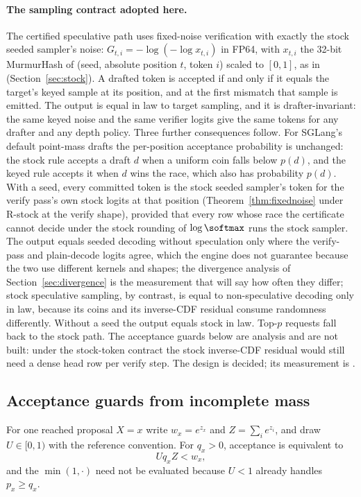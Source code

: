 \paragraph{The sampling contract adopted here.} The certified speculative path uses fixed-noise verification with exactly the stock seeded sampler's noise: $G_{t,i}=-\log(-\log x_{t,i})$ in FP64, with $x_{t,i}$ the 32-bit MurmurHash of (seed, absolute position $t$, token $i$) scaled to $[0,1]$, as in  (Section~\ref{sec:stock}). A drafted token is accepted if and only if it equals the target's keyed sample at its position, and at the first mismatch that sample is emitted. The output is equal in law to target sampling, and it is drafter-invariant: the same keyed noise and the same verifier logits give the same tokens for any drafter and any depth policy. Three further consequences follow. For SGLang's default point-mass drafts the per-position acceptance probability is unchanged: the stock rule accepts a draft $d$ when a uniform coin falls below $p(d)$, and the keyed rule accepts it when $d$ wins the race, which also has probability $p(d)$. With a seed, every committed token is the stock seeded sampler's token for the verify pass's own stock logits at that position (Theorem~\ref{thm:fixednoise} under R-stock at the verify shape), provided that every row whose race the certificate cannot decide under the stock rounding of $\log\softmax$ runs the stock sampler. The output equals seeded decoding without speculation only where the verify-pass and plain-decode logits agree, which the engine does not guarantee because the two use different kernels and shapes; the divergence analysis of Section~\ref{sec:divergence} is the measurement that will say how often they differ; stock speculative sampling, by contrast, is equal to non-speculative decoding only in law, because its coins and its inverse-CDF residual consume randomness differently. Without a seed the output equals stock in law. Top-$p$ requests fall back to the stock path. The acceptance guards below are analysis and are not built: under the stock-token contract the stock inverse-CDF residual would still need a dense head row per verify step. The design is decided; its measurement is .

\subsection{Acceptance guards from incomplete mass}\label{sec:guards}
For one reached proposal $X=x$ write $w_x=e^{z_x}$ and $Z=\sum_ie^{z_i}$, and draw $U\in[0,1)$ with the reference convention. For $q_x>0$, acceptance is equivalent to
\begin{equation}Uq_xZ<w_x,\label{eq:accept}\end{equation}
and the $\min(1,\cdot)$ need not be evaluated because $U<1$ already handles $p_x\ge q_x$.

